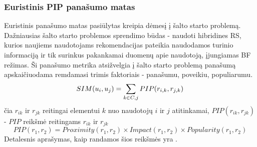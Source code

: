 \documentclass{VUMIFInfMagistrinis}
\begin{document}
\subsubsection{Euristinis PIP panašumo matas}
Euristinis panašumo matas pasiūlytas \cite{7} kreipia dėmesį į šalto starto problemą. Dažniausias šalto starto problemos sprendimo būdas - naudoti hibridines RS, kurios naujiems naudotojams rekomendacijas pateikia naudodamos turinio informaciją ir tik surinkus pakankamai duomenų apie naudotoją, įjungiamas BF režimas. Ši panašumo metrika atsižvelgia į šalto starto problemą panašumą apskaičiuodama remdamasi trimis faktoriais - panašumu, poveikiu, populiarumu.
	\begin{equation}
	\boldmath{SIM}(u_i, u_j)= \sum \limits_{k \in C, j}\boldmath{PIP}(r_{i,k}, r_{j,k})
	\end{equation}
	čia $r_{ik}$ ir $r_{jk}$ reitingai elementui $k$ nuo naudotojų $i$ ir $j$ atitinkamai, $PIP(r_{ik}, r_{jk})$ - $PIP$ reikšmė reitingams $r_{ik}$ ir $r_{jk}$
	\begin{equation}
	PIP(r_1,r_2) = Proximity(r_1,r_2) \times Impact(r_1,r_2) \times Popularity(r_1,r_2)
	\end{equation}
	Detalesnis aprašymas, kaip randamos šios reikšmės yra \cite{7}.
\end{document}
